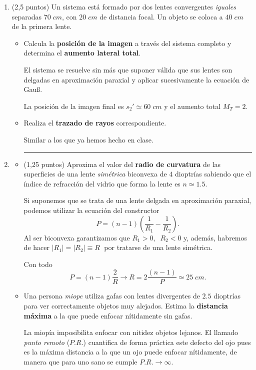 \documentclass[a4paper,14pt]{extarticle}
\title{\textbf{	}}
\date{}
\newcommand{\halmos}{
\vspace*{-1ex}

\begin{flushright}
\rule{1mm}{2.5mm} \end{flushright}
\vspace*{-3ex}

}
\renewcommand{\qed}{\halmos}
\begin{document}

\begin{enumerate}
  \setlength\itemsep{1.5em}
  
   \item (2,5 puntos)	Un sistema está formado por dos lentes convergentes \textit{iguales} separadas $70\;cm$, con $20\;cm$ de distancia focal. Un objeto se coloca a $40\;cm$ de la primera lente. 
		\begin{itemize}
			\item[a)] Calcula la \textbf{posición de la imagen} a través del sistema completo y determina el \textbf{aumento lateral total}.
			\begin{mdframed}[backgroundcolor=brown!10]
			El sistema se resuelve sin más que suponer válida que sus lentes son delgadas en aproximación paraxial y aplicar sucesivamente la ecuación de Gau\ss.
	
	La posición de la imagen final es $\boxed{s_2'\simeq 60\;cm}$ y el aumento total $\boxed{M_T=2.}$
			\end{mdframed}
			\item[b)]  Realiza el \textbf{trazado de rayos} correspondiente.			%
			\begin{mdframed}[backgroundcolor=brown!10]
			Similar a los que ya hemos hecho en clase.
			\end{mdframed}
			
			 \qed
		\end{itemize}
    
    \newpage
    \item  
		\begin{itemize}
			\item[a)] (1,25 puntos) Aproxima el valor del \textbf{radio de curvatura} de las superficies de una lente \textit{simétrica} biconvexa de $4$ dioptrías sabiendo que el índice de refracción del vidrio que forma la lente es $n\simeq 1.5$.
			\begin{mdframed}[backgroundcolor=brown!10]
			Si suponemos que se trata de una lente delgada en aproximación paraxial, podemos utilizar la ecuación del constructor
			$$P=(n-1)\left(\frac{1}{R_1}-\frac{1}{R_2}\right).$$
			Al ser biconvexa garantizamos que $R_1>0,\;\;R_2<0$ y, además, habremos de hacer $|R_1|=|R_2|\equiv R\;$ por tratarse de una lente simétrica.  
			
			Con todo
			$$P=(n-1)\frac{2}{R}\longrightarrow \boxed{R=2\frac{(n-1)}{P}\simeq 25\;cm.}$$
			\end{mdframed}
			\item[b)] Una persona \textit{miope} utiliza gafas con lentes divergentes de $2.5$ dioptrías  para ver correctamente objetos muy alejados.  Estima la \textbf{distancia máxima} a la que puede enfocar nítidamente sin gafas.
			\begin{mdframed}[backgroundcolor=brown!10]
			La miopía imposibilita enfocar con nitidez objetos lejanos. El llamado \textit{punto remoto} ($P.R.$) cuantifica de forma práctica este defecto del ojo pues es la máxima distancia a la que un ojo puede enfocar nítidamente, de manera que para uno sano se cumple $P.R.\to\infty$.
			

\end{mdframed}
\end{itemize}
\end{enumerate}
\end{document}
